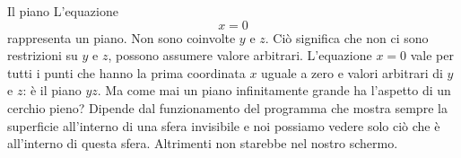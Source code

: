 \begin{surferPage}[Piano]{Il piano}
L'equazione \[x=0\] rappresenta un piano. Non sono coinvolte $y$ e $z$. Ci\`o significa che non ci sono restrizioni su $y$ e $z$, possono assumere valore arbitrari.
L'equazione $x=0$ vale per tutti i punti che hanno la prima coordinata $x$ uguale a zero e valori arbitrari di $y$ e $z$: \`e il piano $yz$.
\newline \newline
Ma come mai un piano infinitamente grande ha l'aspetto di un cerchio pieno? Dipende dal funzionamento del programma che mostra sempre la superficie all'interno di una sfera invisibile e noi possiamo vedere solo ci\`o che \`e all'interno di questa sfera. Altrimenti non starebbe nel nostro schermo.

\end{surferPage}
